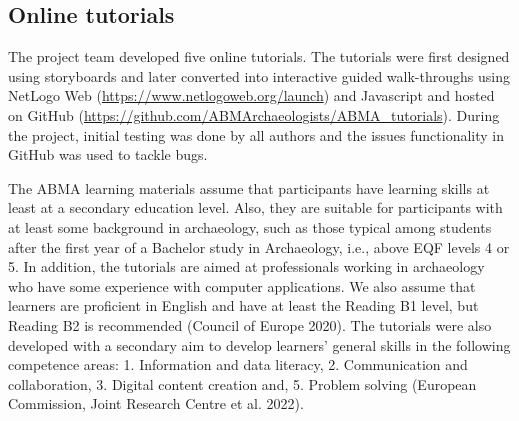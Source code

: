 \documentclass[
]{article}
\begin{document}
\hypertarget{online-tutorials}{%
\subsection{Online tutorials}\label{online-tutorials}}

The project team developed five online tutorials. The tutorials were first designed using storyboards and later converted into interactive guided walk-throughs using NetLogo Web (\url{https://www.netlogoweb.org/launch}) and Javascript and hosted on GitHub (\url{https://github.com/ABMArchaeologists/ABMA_tutorials}). During the project, initial testing was done by all authors and the issues functionality in GitHub was used to tackle bugs.

The ABMA learning materials assume that participants have learning skills at least at a secondary education level. Also, they are suitable for participants with at least some background in archaeology, such as those typical among students after the first year of a Bachelor study in Archaeology, i.e., above EQF levels 4 or 5. In addition, the tutorials are aimed at professionals working in archaeology who have some experience with computer applications. We also assume that learners are proficient in English and have at least the Reading B1 level, but Reading B2 is recommended (Council of Europe 2020). The tutorials were also developed with a secondary aim to develop learners' general skills in the following competence areas: 1. Information and data literacy, 2. Communication and collaboration, 3. Digital content creation and, 5. Problem solving (European Commission, Joint Research Centre et al. 2022).
\end{document}
